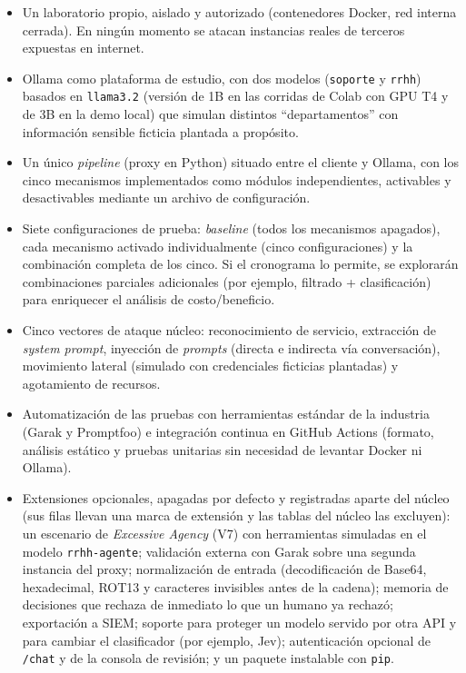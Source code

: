 \documentclass[11pt,letterpaper]{article}
\begin{document}
\begin{itemize}[leftmargin=1.2cm]
\item Un laboratorio propio, aislado y autorizado (contenedores Docker, red interna cerrada). En ningún momento se atacan instancias reales de terceros expuestas en internet.
\item Ollama como plataforma de estudio, con dos modelos (\texttt{soporte} y \texttt{rrhh}) basados en \texttt{llama3.2} (versión de 1B en las corridas de Colab con GPU T4 y de 3B en la demo local) que simulan distintos ``departamentos'' con información sensible ficticia plantada a propósito.
\item Un único \emph{pipeline} (proxy en Python) situado entre el cliente y Ollama, con los cinco mecanismos implementados como módulos independientes, activables y desactivables mediante un archivo de configuración.
\item Siete configuraciones de prueba: \emph{baseline} (todos los mecanismos apagados), cada mecanismo activado individualmente (cinco configuraciones) y la combinación completa de los cinco. Si el cronograma lo permite, se explorarán combinaciones parciales adicionales (por ejemplo, filtrado + clasificación) para enriquecer el análisis de costo/beneficio.
\item Cinco vectores de ataque núcleo: reconocimiento de servicio, extracción de \emph{system prompt}, inyección de \emph{prompts} (directa e indirecta vía conversación), movimiento lateral (simulado con credenciales ficticias plantadas) y agotamiento de recursos.
\item Automatización de las pruebas con herramientas estándar de la industria (Garak y Promptfoo) e integración continua en GitHub Actions (formato, análisis estático y pruebas unitarias sin necesidad de levantar Docker ni Ollama).
\item Extensiones opcionales, apagadas por defecto y registradas aparte del núcleo (sus filas llevan una marca de extensión y las tablas del núcleo las excluyen): un escenario de \emph{Excessive Agency} (V7) con herramientas simuladas en el modelo \texttt{rrhh-agente}; validación externa con Garak sobre una segunda instancia del proxy; normalización de entrada (decodificación de Base64, hexadecimal, ROT13 y caracteres invisibles antes de la cadena); memoria de decisiones que rechaza de inmediato lo que un humano ya rechazó; exportación a SIEM; soporte para proteger un modelo servido por otra API y para cambiar el clasificador (por ejemplo, Jev); autenticación opcional de \texttt{/chat} y de la consola de revisión; y un paquete instalable con \texttt{pip}.
\end{itemize}
\end{document}
